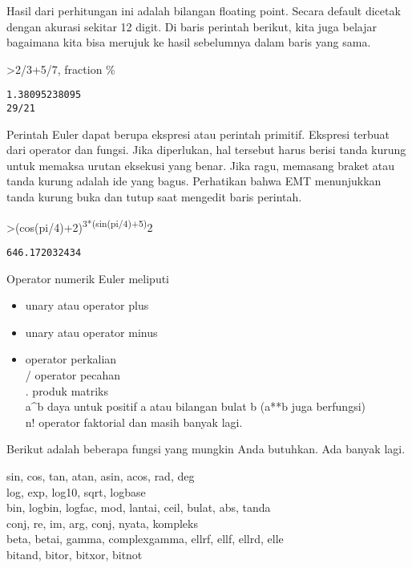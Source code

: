 \documentclass[
]{book}
\providecommand{\tightlist}{%
  \setlength{\itemsep}{0pt}\setlength{\parskip}{0pt}}
\begin{document}
Hasil dari perhitungan ini adalah bilangan floating point. Secara default dicetak dengan akurasi sekitar 12 digit. Di baris perintah berikut, kita juga belajar bagaimana kita bisa merujuk ke hasil sebelumnya dalam baris yang sama.

\textgreater2/3+5/7, fraction \%

\begin{verbatim}
1.38095238095
29/21
\end{verbatim}

Perintah Euler dapat berupa ekspresi atau perintah primitif. Ekspresi terbuat dari operator dan fungsi. Jika diperlukan, hal tersebut harus berisi tanda kurung untuk memaksa urutan eksekusi yang benar. Jika ragu, memasang braket atau tanda kurung adalah ide yang bagus. Perhatikan bahwa EMT menunjukkan tanda kurung buka dan tutup saat mengedit baris perintah.

\textgreater(cos(pi/4)+2)\textsuperscript{3*(sin(pi/4)+5)}2

\begin{verbatim}
646.172032434
\end{verbatim}

Operator numerik Euler meliputi

\begin{itemize}
\tightlist
\item
  unary atau operator plus\\
\item
  unary atau operator minus\\
\item
  operator perkalian\\
  / operator pecahan\\
  . produk matriks\\
  a\^{}b daya untuk positif a atau bilangan bulat b (a**b juga berfungsi)\\
  n! operator faktorial dan masih banyak lagi.
\end{itemize}

Berikut adalah beberapa fungsi yang mungkin Anda butuhkan. Ada banyak lagi.

sin, cos, tan, atan, asin, acos, rad, deg\\
log, exp, log10, sqrt, logbase\\
bin, logbin, logfac, mod, lantai, ceil, bulat, abs, tanda\\
conj, re, im, arg, conj, nyata, kompleks\\
beta, betai, gamma, complexgamma, ellrf, ellf, ellrd, elle\\
bitand, bitor, bitxor, bitnot
\end{document}
